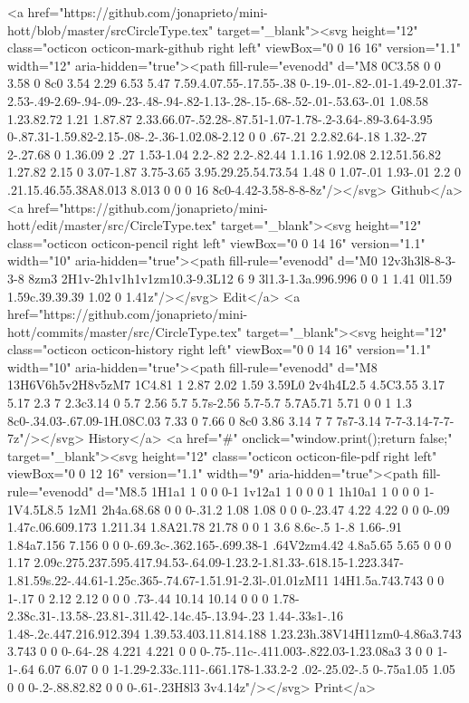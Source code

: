       <a href="https://github.com/jonaprieto/mini-hott/blob/master/srcCircleType.tex" target="_blank"><svg height="12" class="octicon octicon-mark-github right left" viewBox="0 0 16 16" version="1.1" width="12" aria-hidden="true"><path fill-rule="evenodd" d="M8 0C3.58 0 0 3.58 0 8c0 3.54 2.29 6.53 5.47 7.59.4.07.55-.17.55-.38 0-.19-.01-.82-.01-1.49-2.01.37-2.53-.49-2.69-.94-.09-.23-.48-.94-.82-1.13-.28-.15-.68-.52-.01-.53.63-.01 1.08.58 1.23.82.72 1.21 1.87.87 2.33.66.07-.52.28-.87.51-1.07-1.78-.2-3.64-.89-3.64-3.95 0-.87.31-1.59.82-2.15-.08-.2-.36-1.02.08-2.12 0 0 .67-.21 2.2.82.64-.18 1.32-.27 2-.27.68 0 1.36.09 2 .27 1.53-1.04 2.2-.82 2.2-.82.44 1.1.16 1.92.08 2.12.51.56.82 1.27.82 2.15 0 3.07-1.87 3.75-3.65 3.95.29.25.54.73.54 1.48 0 1.07-.01 1.93-.01 2.2 0 .21.15.46.55.38A8.013 8.013 0 0 0 16 8c0-4.42-3.58-8-8-8z"/></svg> Github</a>
      <a href="https://github.com/jonaprieto/mini-hott/edit/master/src/CircleType.tex" target="_blank"><svg height="12" class="octicon octicon-pencil right left" viewBox="0 0 14 16" version="1.1" width="10" aria-hidden="true"><path fill-rule="evenodd" d="M0 12v3h3l8-8-3-3-8 8zm3 2H1v-2h1v1h1v1zm10.3-9.3L12 6 9 3l1.3-1.3a.996.996 0 0 1 1.41 0l1.59 1.59c.39.39.39 1.02 0 1.41z"/></svg> Edit</a>
      <a href="https://github.com/jonaprieto/mini-hott/commits/master/src/CircleType.tex" target="_blank"><svg height="12" class="octicon octicon-history right left" viewBox="0 0 14 16" version="1.1" width="10" aria-hidden="true"><path fill-rule="evenodd" d="M8 13H6V6h5v2H8v5zM7 1C4.81 1 2.87 2.02 1.59 3.59L0 2v4h4L2.5 4.5C3.55 3.17 5.17 2.3 7 2.3c3.14 0 5.7 2.56 5.7 5.7s-2.56 5.7-5.7 5.7A5.71 5.71 0 0 1 1.3 8c0-.34.03-.67.09-1H.08C.03 7.33 0 7.66 0 8c0 3.86 3.14 7 7 7s7-3.14 7-7-3.14-7-7-7z"/></svg> History</a>
      <a  href="#" onclick="window.print();return false;" target="_blank"><svg height="12" class="octicon octicon-file-pdf right left" viewBox="0 0 12 16" version="1.1" width="9" aria-hidden="true"><path fill-rule="evenodd" d="M8.5 1H1a1 1 0 0 0-1 1v12a1 1 0 0 0 1 1h10a1 1 0 0 0 1-1V4.5L8.5 1zM1 2h4a.68.68 0 0 0-.31.2 1.08 1.08 0 0 0-.23.47 4.22 4.22 0 0 0-.09 1.47c.06.609.173 1.211.34 1.8A21.78 21.78 0 0 1 3.6 8.6c-.5 1-.8 1.66-.91 1.84a7.156 7.156 0 0 0-.69.3c-.362.165-.699.38-1 .64V2zm4.42 4.8a5.65 5.65 0 0 0 1.17 2.09c.275.237.595.417.94.53-.64.09-1.23.2-1.81.33-.618.15-1.223.347-1.81.59s.22-.44.61-1.25c.365-.74.67-1.51.91-2.3l-.01.01zM11 14H1.5a.743.743 0 0 1-.17 0 2.12 2.12 0 0 0 .73-.44 10.14 10.14 0 0 0 1.78-2.38c.31-.13.58-.23.81-.31l.42-.14c.45-.13.94-.23 1.44-.33s1-.16 1.48-.2c.447.216.912.394 1.39.53.403.11.814.188 1.23.23h.38V14H11zm0-4.86a3.743 3.743 0 0 0-.64-.28 4.221 4.221 0 0 0-.75-.11c-.411.003-.822.03-1.23.08a3 3 0 0 1-1-.64 6.07 6.07 0 0 1-1.29-2.33c.111-.661.178-1.33.2-2 .02-.25.02-.5 0-.75a1.05 1.05 0 0 0-.2-.88.82.82 0 0 0-.61-.23H8l3 3v4.14z"/></svg> Print</a>
